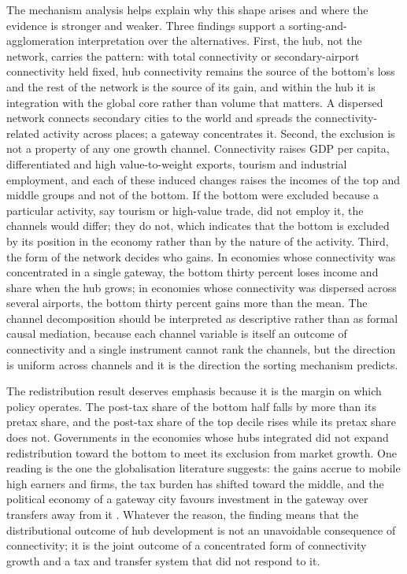 The mechanism analysis helps explain why this shape arises and where the evidence is stronger and weaker. Three findings support a sorting-and-agglomeration interpretation over the alternatives. First, the hub, not the network, carries the pattern: with total connectivity or secondary-airport connectivity held fixed, hub connectivity remains the source of the bottom's loss and the rest of the network is the source of its gain, and within the hub it is integration with the global core rather than volume that matters. A dispersed network connects secondary cities to the world and spreads the connectivity-related activity across places; a gateway concentrates it. Second, the exclusion is not a property of any one growth channel. Connectivity raises GDP per capita, differentiated and high value-to-weight exports, tourism and industrial employment, and each of these induced changes raises the incomes of the top and middle groups and not of the bottom. If the bottom were excluded because a particular activity, say tourism or high-value trade, did not employ it, the channels would differ; they do not, which indicates that the bottom is excluded by its position in the economy rather than by the nature of the activity. Third, the form of the network decides who gains. In economies whose connectivity was concentrated in a single gateway, the bottom thirty percent loses income and share when the hub grows; in economies whose connectivity was dispersed across several airports, the bottom thirty percent gains more than the mean. The channel decomposition should be interpreted as descriptive rather than as formal causal mediation, because each channel variable is itself an outcome of connectivity and a single instrument cannot rank the channels, but the direction is uniform across channels and it is the direction the sorting mechanism predicts.

The redistribution result deserves emphasis because it is the margin on which policy operates. The post-tax share of the bottom half falls by more than its pretax share, and the post-tax share of the top decile rises while its pretax share does not. Governments in the economies whose hubs integrated did not expand redistribution toward the bottom to meet its exclusion from market growth. One reading is the one the globalisation literature suggests: the gains accrue to mobile high earners and firms, the tax burden has shifted toward the middle, and the political economy of a gateway city favours investment in the gateway over transfers away from it \citep{Egger_2019,Kleven_2013}. Whatever the reason, the finding means that the distributional outcome of hub development is not an unavoidable consequence of connectivity; it is the joint outcome of a concentrated form of connectivity growth and a tax and transfer system that did not respond to it.

